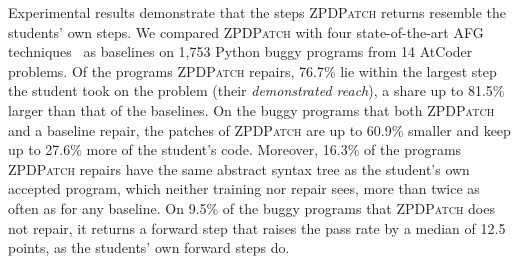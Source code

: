 \documentclass[conference]{IEEEtran}
\begin{document}
Experimental results demonstrate that the steps \textsc{ZPDPatch} returns resemble the students' own steps. We compared \textsc{ZPDPatch} with four state-of-the-art AFG techniques~\cite{hu2019re,xie2024brafar,choi2025automated,dai2026learner} as baselines on 1,753 Python buggy programs from 14 AtCoder problems. Of the programs \textsc{ZPDPatch} repairs, 76.7\% lie within the largest step the student took on the problem (their \emph{demonstrated reach}), a share up to 81.5\% larger than that of the baselines. On the buggy programs that both \textsc{ZPDPatch} and a baseline repair, the patches of \textsc{ZPDPatch} are up to 60.9\% smaller and keep up to 27.6\% more of the student's code. Moreover, 16.3\% of the programs \textsc{ZPDPatch} repairs have the same abstract syntax tree as the student's own accepted program, which neither training nor repair sees, more than twice as often as for any baseline. On 9.5\% of the buggy programs that \textsc{ZPDPatch} does not repair, it returns a forward step that raises the pass rate by a median of 12.5 points, as the students' own forward steps do.
\end{document}
